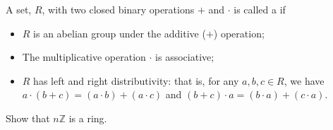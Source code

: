 \begin{defn} \label{def:ring}
A set, $R$, with two closed binary operations $+$ and $\cdot$  is called a  if 
\begin{itemize}
\item
$R$ is an abelian group under the additive ($+$) operation;
\item
The multiplicative operation $\cdot$ is associative;
\item 
$R$ has left and right distributivity: that is, for any $a,b,c \in R$, we have $a \cdot (b + c) = (a \cdot b) + (a \cdot c)$ and $(b + c) \cdot a = (b \cdot a) + (c \cdot a)$.
\end{itemize}
\end{defn}

\begin{exercise}{}
Show that $n\mathbb{Z}$ is a ring.
\end{exercise}{}

